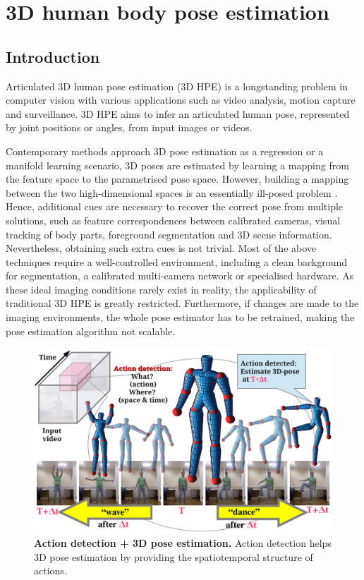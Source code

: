 \chapter{3D human body pose estimation}
\label{chap/body}

\section{Introduction}
\label{sec/body/intro}

Articulated 3D human pose estimation (3D HPE) is a longstanding problem in computer vision with various applications such as video analysis, motion capture and surveillance.
3D HPE aims to infer an articulated human pose, represented by joint positions or angles, from input images or videos. 

Contemporary methods approach 3D pose estimation as a regression or a manifold learning scenario, 3D poses are estimated by learning a mapping from the feature space to the parametrised pose space. However, building a mapping between the two high-dimensional spaces is an essentially ill-posed problem \cite{Elgammal2004}. Hence, additional cues are necessary to recover the correct pose from multiple solutions, such as feature correspondences between calibrated cameras, visual tracking of body parts, foreground segmentation and 3D scene information. 
Nevertheless, obtaining such extra cues is not trivial. 
Most of the above techniques require a well-controlled environment, including a clean background for segmentation, a calibrated multi-camera network or specialised hardware.   
As these ideal imaging conditions rarely exist in reality, the applicability of traditional 3D HPE is greatly restricted. 
Furthermore, if changes are made to the imaging environments, the whole pose estimator has to be retrained, making the pose estimation algorithm not scalable. 

\begin{figure}[th]
	\centering
	\includegraphics[width=1\linewidth]{fig/body/figure1_actionexplain.pdf} 
	\caption{\textbf{Action detection + 3D pose estimation.} Action detection helps 3D pose estimation by providing the spatiotemporal structure of actions.} 
	\label{fig/body/actionexplain}
\end{figure}

